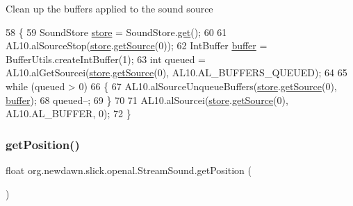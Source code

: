 Clean up the buffers applied to the sound source 
\begin{DoxyCode}
58                                  \{
59         SoundStore \mbox{\hyperlink{classorg_1_1newdawn_1_1slick_1_1openal_1_1_audio_impl_a1f616264ac2d6ec44cb0c187836d34f5}{store}} = SoundStore.\mbox{\hyperlink{classorg_1_1newdawn_1_1slick_1_1openal_1_1_sound_store_a826b5faeb77b23d9d93cb47824a8c854}{get}}();
60         
61         AL10.alSourceStop(\mbox{\hyperlink{classorg_1_1newdawn_1_1slick_1_1openal_1_1_audio_impl_a1f616264ac2d6ec44cb0c187836d34f5}{store}}.\mbox{\hyperlink{classorg_1_1newdawn_1_1slick_1_1openal_1_1_sound_store_a36b83b67fccef1cd5167d2ea11e89f6a}{getSource}}(0));
62         IntBuffer \mbox{\hyperlink{classorg_1_1newdawn_1_1slick_1_1openal_1_1_audio_impl_ac08b49601da30895fecfdca4e8ba0049}{buffer}} = BufferUtils.createIntBuffer(1);
63         \textcolor{keywordtype}{int} queued = AL10.alGetSourcei(\mbox{\hyperlink{classorg_1_1newdawn_1_1slick_1_1openal_1_1_audio_impl_a1f616264ac2d6ec44cb0c187836d34f5}{store}}.\mbox{\hyperlink{classorg_1_1newdawn_1_1slick_1_1openal_1_1_sound_store_a36b83b67fccef1cd5167d2ea11e89f6a}{getSource}}(0), AL10.AL\_BUFFERS\_QUEUED);
64         
65         \textcolor{keywordflow}{while} (queued > 0)
66         \{
67             AL10.alSourceUnqueueBuffers(\mbox{\hyperlink{classorg_1_1newdawn_1_1slick_1_1openal_1_1_audio_impl_a1f616264ac2d6ec44cb0c187836d34f5}{store}}.\mbox{\hyperlink{classorg_1_1newdawn_1_1slick_1_1openal_1_1_sound_store_a36b83b67fccef1cd5167d2ea11e89f6a}{getSource}}(0), \mbox{\hyperlink{classorg_1_1newdawn_1_1slick_1_1openal_1_1_audio_impl_ac08b49601da30895fecfdca4e8ba0049}{buffer}});
68             queued--;
69         \}
70         
71         AL10.alSourcei(\mbox{\hyperlink{classorg_1_1newdawn_1_1slick_1_1openal_1_1_audio_impl_a1f616264ac2d6ec44cb0c187836d34f5}{store}}.\mbox{\hyperlink{classorg_1_1newdawn_1_1slick_1_1openal_1_1_sound_store_a36b83b67fccef1cd5167d2ea11e89f6a}{getSource}}(0), AL10.AL\_BUFFER, 0);
72     \}
\end{DoxyCode}
\mbox{\label{classorg_1_1newdawn_1_1slick_1_1openal_1_1_stream_sound_a80df2cee9e1a68cd0c0bdb2f9140ffe6}} 
\subsubsection{\texorpdfstring{get\+Position()}{getPosition()}}
{\footnotesize\ttfamily float org.\+newdawn.\+slick.\+openal.\+Stream\+Sound.\+get\+Position (\begin{DoxyParamCaption}{ }\end{DoxyParamCaption})\hspace{0.3cm}{\ttfamily [inline]}}

